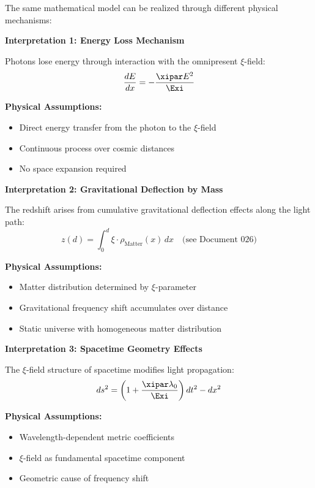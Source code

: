 	The same mathematical model can be realized through different physical mechanisms:
	
	\begin{alternative}
		\textbf{Interpretation 1: Energy Loss Mechanism}
		
		Photons lose energy through interaction with the omnipresent $\xi$-field:
		\begin{equation}
			\frac{dE}{dx} = -\frac{\xipar E^2}{\Exi}
		\end{equation}
		
		\textbf{Physical Assumptions:}
		\begin{itemize}
			\item Direct energy transfer from the photon to the $\xi$-field
			\item Continuous process over cosmic distances
			\item No space expansion required
		\end{itemize}
	\end{alternative}
	
	\begin{alternative}
		\textbf{Interpretation 2: Gravitational Deflection by Mass}
		
		The redshift arises from cumulative gravitational deflection effects along the light path:
		\begin{equation}
			z(d) = \int_0^d \xi \cdot \rho_{\text{Matter}}(x)\, dx \quad \text{(see Document~026)}
		\end{equation}
		
		\textbf{Physical Assumptions:}
		\begin{itemize}
			\item Matter distribution determined by $\xi$-parameter
			\item Gravitational frequency shift accumulates over distance
			\item Static universe with homogeneous matter distribution
		\end{itemize}
	\end{alternative}
	
	\begin{alternative}
		\textbf{Interpretation 3: Spacetime Geometry Effects}
		
		The $\xi$-field structure of spacetime modifies light propagation:
		\begin{equation}
			ds^2 = \left(1 + \frac{\xipar \lambda_0}{\Exi}\right) dt^2 - dx^2
		\end{equation}
		
		\textbf{Physical Assumptions:}
		\begin{itemize}
			\item Wavelength-dependent metric coefficients
			\item $\xi$-field as fundamental spacetime component
			\item Geometric cause of frequency shift
		\end{itemize}
	\end{alternative}
	
